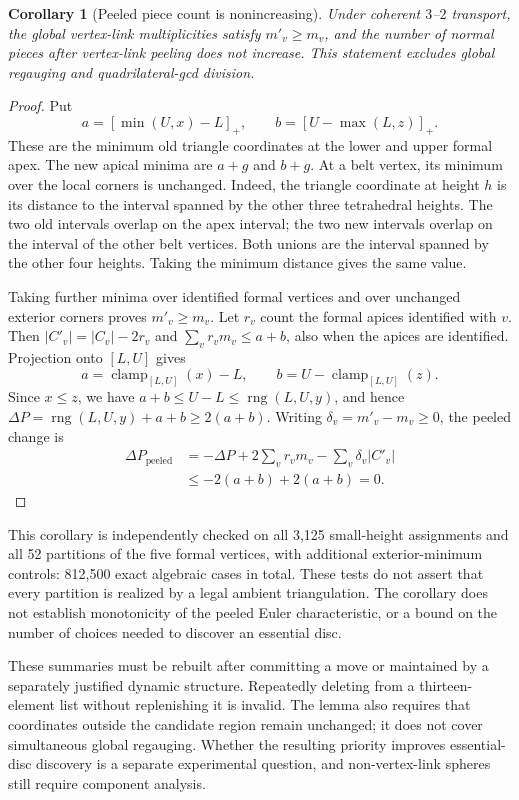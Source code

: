 \documentclass[11pt,letterpaper]{article}
\newtheorem{corollary}[theorem]{Corollary}
\theoremstyle{definition}
\theoremstyle{remark}
\newcommand{\rng}{\operatorname{rng}}
\begin{document}
\begin{corollary}[Peeled piece count is nonincreasing]
\label{cor:peeled-pieces}
Under coherent $3$--$2$ transport, the global vertex-link multiplicities
satisfy $m'_v\ge m_v$, and the number of normal pieces after vertex-link
peeling does not increase. This statement excludes global regauging and
quadrilateral-gcd division.
\end{corollary}
\begin{proof}
Put
\[
 a=[\min(U,x)-L]_+,\qquad b=[U-\max(L,z)]_+.
\]
These are the minimum old triangle coordinates at the lower and upper
formal apex. The new apical minima are $a+g$ and $b+g$.
At a belt vertex, its minimum over the local corners is unchanged.
Indeed, the triangle coordinate at height $h$ is its distance to the
interval spanned by the other three tetrahedral heights. The two old
intervals overlap on the apex interval; the two new intervals overlap
on the interval of the other belt vertices. Both unions are the interval
spanned by the other four heights. Taking the minimum distance gives
the same value.

Taking further minima over identified formal vertices and over unchanged
exterior corners proves $m'_v\ge m_v$. Let $r_v$ count the formal apices
identified with $v$. Then $|C'_v|=|C_v|-2r_v$ and
$\sum_v r_vm_v\le a+b$, also when the apices are identified. Projection
onto $[L,U]$ gives
\[
 a=\operatorname{clamp}_{[L,U]}(x)-L,\qquad
 b=U-\operatorname{clamp}_{[L,U]}(z).
\]
Since $x\le z$, we have
$a+b\le U-L\le\rng(L,U,y)$, and hence
$\Delta P=\rng(L,U,y)+a+b\ge2(a+b)$.
Writing $\delta_v=m'_v-m_v\ge0$, the peeled change is
\begin{align*}
 \Delta P_{\mathrm{peeled}}
 &=-\Delta P+2\sum_v r_vm_v-\sum_v\delta_v|C'_v|\\
 &\le-2(a+b)+2(a+b)=0.
\end{align*}
\end{proof}

This corollary is independently checked on all 3,125 small-height
assignments and all 52 partitions of the five formal vertices, with
additional exterior-minimum controls: 812,500 exact algebraic cases in
total. These tests do not assert that every partition is realized by a
legal ambient triangulation. The corollary does not establish monotonicity
of the peeled Euler characteristic, or a bound on the number of choices
needed to discover an essential disc.

These summaries must be rebuilt after committing a move or maintained by
a separately justified dynamic structure. Repeatedly deleting from a
thirteen-element list without replenishing it is invalid. The lemma also
requires that coordinates outside the candidate region remain unchanged;
it does not cover simultaneous global regauging. Whether the resulting
priority improves essential-disc discovery is a separate experimental
question, and non-vertex-link spheres still require component analysis.
\end{document}
